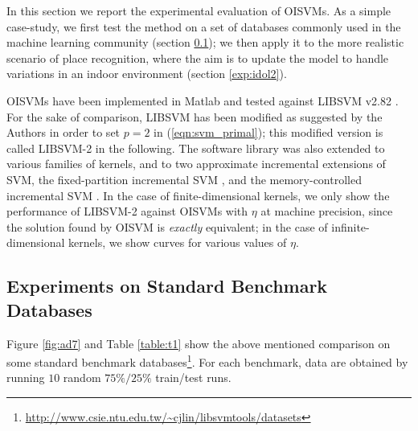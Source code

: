 In this section we report the experimental evaluation of OISVMs. As a
simple case-study, we first test the method on a set of databases
commonly used in the machine learning community (section
\ref{exp:ml}); we then apply it to the more realistic scenario of
place recognition, where the aim is to update the model to handle
variations in an indoor environment (section
\ref{exp:idol2}).

OISVMs have been implemented in Matlab and tested against LIBSVM v2.82
\cite{ChangL01}. For the sake of comparison, LIBSVM has been modified
as suggested by the Authors in order to set $p=2$ in
(\ref{eqn:svm_primal}); this modified version is called LIBSVM-2 in
the following.  The software library was also extended to various
families of kernels, and to two approximate incremental extensions of
SVM, the fixed-partition incremental SVM \cite{syed99incremental}, and
the memory-controlled incremental SVM \cite{pronobis:icvs06}.  In the case
of finite-dimensional kernels, we only show the performance of
LIBSVM-2 against OISVMs with $\eta$ at machine precision, since the
solution found by OISVM is \emph{exactly} equivalent; in the case of
infinite-dimensional kernels, we show curves for various values of
$\eta$.

\subsection{Experiments on Standard Benchmark Databases}
\label{exp:ml}

Figure \ref{fig:ad7} and Table \ref{table:t1} show the above mentioned
comparison on some standard benchmark databases\footnote{
\url{http://www.csie.ntu.edu.tw/~cjlin/libsvmtools/datasets}}.  For
each benchmark, data are obtained by running $10$ random $75\%/25\%$
train/test runs.


